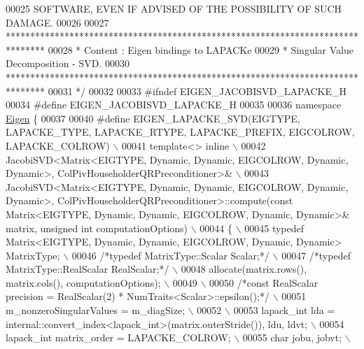 \begin{DoxyCode}
00025 \textcolor{comment}{ SOFTWARE, EVEN IF ADVISED OF THE POSSIBILITY OF SUCH DAMAGE.}
00026 \textcolor{comment}{}
00027 \textcolor{comment}{ ********************************************************************************}
00028 \textcolor{comment}{ *   Content : Eigen bindings to LAPACKe}
00029 \textcolor{comment}{ *    Singular Value Decomposition - SVD.}
00030 \textcolor{comment}{ ********************************************************************************}
00031 \textcolor{comment}{*/}
00032 
00033 \textcolor{preprocessor}{#ifndef EIGEN\_JACOBISVD\_LAPACKE\_H}
00034 \textcolor{preprocessor}{#define EIGEN\_JACOBISVD\_LAPACKE\_H}
00035 
00036 \textcolor{keyword}{namespace }\hyperlink{namespace_eigen}{Eigen} \{ 
00037 
00040 \textcolor{preprocessor}{#define EIGEN\_LAPACKE\_SVD(EIGTYPE, LAPACKE\_TYPE, LAPACKE\_RTYPE, LAPACKE\_PREFIX, EIGCOLROW, LAPACKE\_COLROW) 
      \(\backslash\)}
00041 \textcolor{preprocessor}{template<> inline \(\backslash\)}
00042 \textcolor{preprocessor}{JacobiSVD<Matrix<EIGTYPE, Dynamic, Dynamic, EIGCOLROW, Dynamic, Dynamic>,
       ColPivHouseholderQRPreconditioner>& \(\backslash\)}
00043 \textcolor{preprocessor}{JacobiSVD<Matrix<EIGTYPE, Dynamic, Dynamic, EIGCOLROW, Dynamic, Dynamic>,
       ColPivHouseholderQRPreconditioner>::compute(const Matrix<EIGTYPE, Dynamic, Dynamic, EIGCOLROW, Dynamic, Dynamic>& matrix, unsigned int
       computationOptions) \(\backslash\)}
00044 \textcolor{preprocessor}{\{ \(\backslash\)}
00045 \textcolor{preprocessor}{  typedef Matrix<EIGTYPE, Dynamic, Dynamic, EIGCOLROW, Dynamic, Dynamic> MatrixType; \(\backslash\)}
00046 \textcolor{preprocessor}{  }\textcolor{comment}{/*typedef MatrixType::Scalar Scalar;*/}\textcolor{preprocessor}{ \(\backslash\)}
00047 \textcolor{preprocessor}{  }\textcolor{comment}{/*typedef MatrixType::RealScalar RealScalar;*/}\textcolor{preprocessor}{ \(\backslash\)}
00048 \textcolor{preprocessor}{  allocate(matrix.rows(), matrix.cols(), computationOptions); \(\backslash\)}
00049 \textcolor{preprocessor}{\(\backslash\)}
00050 \textcolor{preprocessor}{  }\textcolor{comment}{/*const RealScalar precision = RealScalar(2) * NumTraits<Scalar>::epsilon();*/}\textcolor{preprocessor}{ \(\backslash\)}
00051 \textcolor{preprocessor}{  m\_nonzeroSingularValues = m\_diagSize; \(\backslash\)}
00052 \textcolor{preprocessor}{\(\backslash\)}
00053 \textcolor{preprocessor}{  lapack\_int lda = internal::convert\_index<lapack\_int>(matrix.outerStride()), ldu, ldvt; \(\backslash\)}
00054 \textcolor{preprocessor}{  lapack\_int matrix\_order = LAPACKE\_COLROW; \(\backslash\)}
00055 \textcolor{preprocessor}{  char jobu, jobvt; \(\backslash\)}

\end{DoxyCode}
